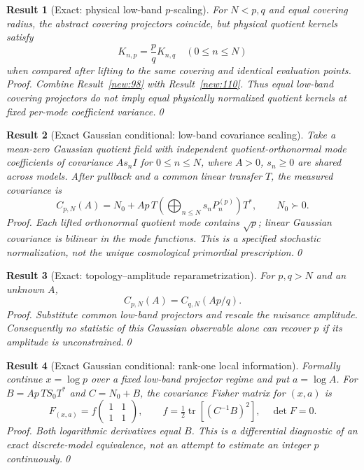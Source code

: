 \documentclass[aps,prd,onecolumn,notitlepage,groupedaddress,11pt]{revtex4-2}
\newtheorem{result}{Result}
\begin{document}
\begin{result}[\textsf{Exact}: physical low-band $p$-scaling]\label{new:113}
For $N<p,q$ and equal covering radius, the abstract covering projectors coincide, but physical quotient kernels satisfy
\begin{equation}\label{new:eq113}
K_{n,p}=\frac pq K_{n,q}\quad(0\le n\le N)
\end{equation}
when compared after lifting to the same covering and identical evaluation points. \textit{Proof.} Combine Result~\ref{new:98} with Result~\ref{new:110}. Thus equal low-band covering projectors do \emph{not} imply equal physically normalized quotient kernels at fixed per-mode coefficient variance.\qed
\end{result}
\begin{result}[\textsf{Exact Gaussian conditional}: low-band covariance scaling]\label{new:114}
Take a mean-zero Gaussian quotient field with independent quotient-orthonormal mode coefficients of covariance $A s_n I$ for $0\le n\le N$, where $A>0$, $s_n\ge0$ are shared across models. After pullback and a common linear transfer $T$, the measured covariance is
\begin{equation}\label{new:eq114}
C_{p,N}(A)=N_0+A p\,T\!\left(\bigoplus_{n\le N}s_n P_n^{(p)}\right)\!T^*,\qquad N_0\succ0.
\end{equation}
\textit{Proof.} Each lifted orthonormal quotient mode contains $\sqrt p$; linear Gaussian covariance is bilinear in the mode functions. This is a specified stochastic normalization, not the unique cosmological primordial prescription.\qed
\end{result}
\begin{result}[\textsf{Exact}: topology--amplitude reparametrization]\label{new:115}
For $p,q>N$ and an unknown $A$,
\begin{equation}\label{new:eq115}
C_{p,N}(A)=C_{q,N}(Ap/q).
\end{equation}
\textit{Proof.} Substitute common low-band projectors and rescale the nuisance amplitude. Consequently no statistic of this Gaussian observable alone can recover $p$ if its amplitude is unconstrained.\qed
\end{result}
\begin{result}[\textsf{Exact Gaussian conditional}: rank-one local information]\label{new:116}
Formally continue $x=\log p$ over a fixed low-band projector regime and put $a=\log A$. For $B=Ap\,TS_0T^*$ and $C=N_0+B$, the covariance Fisher matrix for $(x,a)$ is
\begin{equation}\label{new:eq116}
F_{(x,a)}=f\begin{pmatrix}1&1\\1&1\end{pmatrix},\qquad f=\tfrac12\operatorname{tr}[(C^{-1}B)^2],\quad \det F=0.
\end{equation}
\textit{Proof.} Both logarithmic derivatives equal $B$. This is a differential diagnostic of an exact discrete-model equivalence, not an attempt to estimate an integer $p$ continuously.\qed
\end{result}
\end{document}
